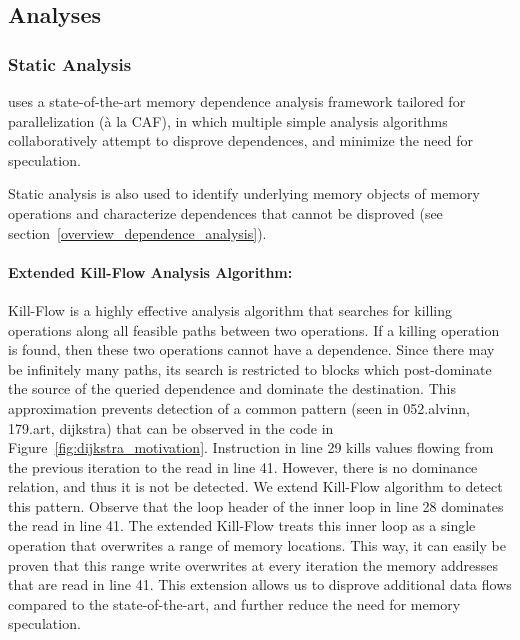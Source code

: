 \subsection {Analyses}

\subsubsection{Static Analysis}

\name uses a state-of-the-art memory dependence analysis framework
tailored for parallelization (\`{a} la CAF\cite{johnson:cgo:17}), in
which multiple simple analysis algorithms collaboratively attempt to
disprove dependences, and minimize the need for speculation.

Static analysis is also used to identify underlying memory objects of
memory operations and characterize dependences that cannot
be disproved (see section~\ref{overview_dependence_analysis}).

\paragraph{Extended Kill-Flow Analysis Algorithm:}
Kill-Flow is a highly effective analysis algorithm that searches for
killing operations along all feasible paths between two operations. If
a killing operation is found, then these two operations cannot have a
dependence.  Since  there  may  be  infinitely  many  paths,  its
search is restricted to blocks which post-dominate the source of the
queried dependence and dominate the destination.
%
This approximation prevents detection of a common pattern (seen in
052.alvinn, 179.art, dijkstra) that can be observed in the code in
Figure~\ref{fig:dijkstra_motivation}.
%
Instruction in line 29 kills values flowing from the previous
iteration to the read in line 41.  However, there is no dominance
relation, and thus it is not be detected.
%
We extend Kill-Flow algorithm to detect this pattern.  Observe that
the loop header of the inner loop in line 28 dominates the read in
line 41.  The extended Kill-Flow treats this inner loop as a single
operation that overwrites a range of memory locations. This way, it
can easily be proven that this range write overwrites at every
iteration the memory addresses that are read in line 41.
%
%
This extension allows us to disprove additional data flows compared to
the state-of-the-art, and further reduce the need for memory
speculation.

